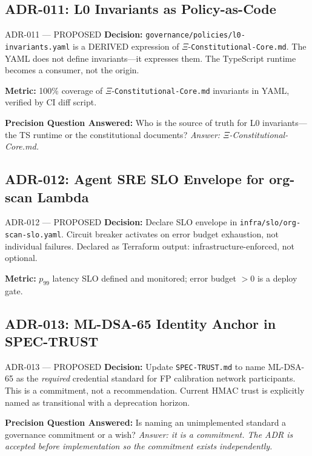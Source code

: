 \documentclass[12pt,a4paper]{article}
\theoremstyle{definition}
\theoremstyle{remark}
\begin{document}
\subsection{ADR-011: L0 Invariants as Policy-as-Code}

\begin{adrbox}{ADR-011 — PROPOSED}
\textbf{Decision:} \texttt{governance/policies/l0-invariants.yaml} is a DERIVED
expression of $\Xi$-\texttt{Constitutional-Core.md}. The YAML does not define
invariants---it expresses them. The TypeScript runtime becomes a consumer, not
the origin.

\textbf{Metric:} 100\% coverage of $\Xi$-\texttt{Constitutional-Core.md}
invariants in YAML, verified by CI diff script.

\textbf{Precision Question Answered:} Who is the source of truth for L0
invariants---the TS runtime or the constitutional documents?
\emph{Answer: $\Xi$-Constitutional-Core.md.}
\end{adrbox}

\subsection{ADR-012: Agent SRE SLO Envelope for org-scan Lambda}

\begin{adrbox}{ADR-012 — PROPOSED}
\textbf{Decision:} Declare SLO envelope in \texttt{infra/slo/org-scan-slo.yaml}.
Circuit breaker activates on error budget exhaustion, not individual failures.
Declared as Terraform output: infrastructure-enforced, not optional.

\textbf{Metric:} $p_{99}$ latency SLO defined and monitored; error budget $> 0$
is a deploy gate.
\end{adrbox}

\subsection{ADR-013: ML-DSA-65 Identity Anchor in SPEC-TRUST}

\begin{adrbox}{ADR-013 — PROPOSED}
\textbf{Decision:} Update \texttt{SPEC-TRUST.md} to name ML-DSA-65 as the
\emph{required} credential standard for FP calibration network participants.
This is a commitment, not a recommendation. Current HMAC trust is explicitly
named as transitional with a deprecation horizon.

\textbf{Precision Question Answered:} Is naming an unimplemented standard a
governance commitment or a wish? \emph{Answer: it is a commitment. The ADR
is accepted before implementation so the commitment exists independently.}
\end{adrbox}
\end{document}

